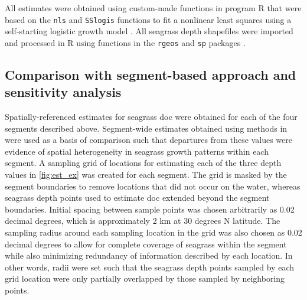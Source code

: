 \documentclass[letterpaper,12pt,oneside]{article}\usepackage[]{graphicx}\usepackage[]{color}
\begin{document}
All estimates were obtained using custom-made functions in program R that were based on the \texttt{nls} and \texttt{SSlogis} functions to fit a nonlinear least squares using a self-starting logistic growth model \citep{Bates92,RDCT14}.  All seagrass depth shapefiles were imported and processed in R using functions in the \texttt{rgeos} and \texttt{sp} packages \citep{Bivand08,Bivand14}.  

\subsection{Comparison with segment-based approach and sensitivity analysis}

Spatially-referenced estimates for seagrass \ac{doc} were obtained for each of the four segments described above.  Segment-wide estimates obtained using methods in  were used as a basis of comparison such that departures from these values were evidence of spatial heterogeneity in seagrass growth patterns within each segment.  A sampling grid of locations for estimating each of the three depth values in \cref{fig:est_ex} was created for each segment.  The grid is masked by the segment boundaries to remove locations that did not occur on the water, whereas seagrass depth points used to estimate \ac{doc} extended beyond the segment  boundaries.  Initial spacing between sample points was chosen arbitrarily as 0.02 decimal degrees, which is approximately 2 km at 30 degrees N latitude.  The sampling radius around each sampling location in the grid was also chosen as 0.02 decimal degrees to allow for complete coverage of seagrass within the segment while also minimizing redundancy of information described by each location.  In other words, radii were set such that the seagrass depth points sampled by each grid location were only partially overlapped by those sampled by neighboring points.
\end{document}
